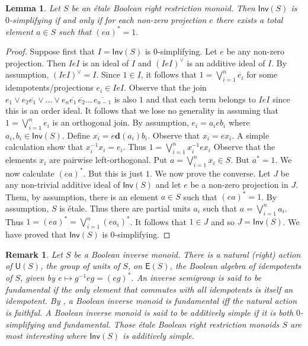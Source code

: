 \documentclass[a4paper]{amsart}
\newtheorem{lemma}[theorem]{Lemma}
\newtheorem{remark}[theorem]{Remark}
\begin{document}
\begin{lemma}\label{lem:ideals} Let $S$ be an \'etale Boolean right restriction monoid.
Then $\mathsf{Inv}(S)$ is $0$-simplifying if and only if
for each non-zero projection $e$ there exists a total  element $a \in S$ such that $(ea)^{\ast} = 1$.
\end{lemma}
\begin{proof} Suppose first that $I = \mathsf{Inv}(S)$ is $0$-simplifying.
Let $e$ be any non-zero projection.
Then $IeI$ is an ideal of $I$ and $(IeI)^{\vee}$ is an additive ideal of $I$.
By assumption, $(IeI)^{\vee} = I$.
Since $1 \in I$, it follows that $1 = \bigvee_{i=1}^{n} e_{i}$
for some idempotents/projections $e_{i} \in IeI$. 
Observe that the join $e_{1} \vee e_{2} \overline{e_{1}} \vee \ldots \vee e_{n} \overline{e_{1}} \, \overline{e_{2}} \ldots \, \overline{e_{n-1}}$
is also $1$ and that each term belongs to $IeI$ since this is an order ideal.
It follows that we lose no generality in assuming that $1 = \bigvee_{i=1}^{n} e_{i}$ is an orthogonal join.
By assumption, $e_{i} = a_{i}eb_{i}$ where $a_{i}, b_{i} \in \mathsf{Inv}(S)$.
Define $x_{i} = e\mathbf{d}(a_{i})b_{i}$.
Observe that $x_{i} = ex_{i}$.
A simple calculation show that $x_{i}^{-1}x_{i} = e_{i}$.
Thus $1 = \bigvee_{i=1}^{n} x_{i}^{-1}ex_{i}$
Observe that the elements $x_{i}$ are pairwise left-orthogonal.
Put $a = \bigvee_{i=1}^{n} x_{i} \in S$.
But $a^{\ast} = 1$.
We now calculate $(ea)^{\ast}$.
But this is just $1$.
We now prove the converse.
Let $J$ be any non-trivial additive ideal of $\mathsf{Inv}(S)$
and let $e$ be a non-zero projection in $J$.
Them, by assumption, there is an element $a \in S$ such that $(ea)^{\ast} = 1$.
By assumption, $S$ is \'etale.
Thus there are partial units $a_{i}$ such that $a = \bigvee_{i=1}^{n} a_{i}$.
Thus $1 = (ea)^{\ast} = \bigvee_{i=1}^{n} (ea_{i})^{\ast}$.
It follows that $1 \in J$ and so $J = \mathsf{Inv}(S)$.
We have proved that $\mathsf{Inv}(S)$ is $0$-simplifying.
\end{proof}


\begin{remark}
{\em Let $S$ be a Boolean inverse monoid.
There is a {\em natural (right) action} of $\mathsf{U}(S)$, the group of units of $S$, on $\mathsf{E}(S)$, the Boolean algebra of idempotents of $S$, given by
$e \mapsto g^{-1}eg = (eg)^{\ast}$.
An inverse semigroup is said to be {\em fundamental}  
if the only element that commutes with all idempotents is itself an idempotent.
By \cite[Lemma 5.5]{Lawson2016},  a Boolean inverse monoid is fundamental iff the natural action is faithful.
A Boolean inverse monoid is said to be {\em additively simple}
if it is both $0$-simplifying and fundamental.
Those \'etale Boolean right restriction monoids $S$ are most interesting
where $\mathsf{Inv}(S)$ is additively simple.
}
\end{remark}
\end{document}

